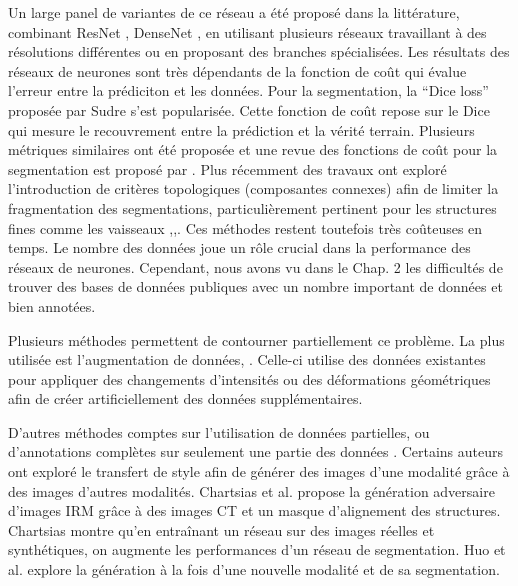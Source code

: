       Un large panel de variantes de ce réseau a été proposé dans la littérature, combinant ResNet \cite{yu2019_liver_ResUnet}, DenseNet \cite{Li2018_DenseUnet}, en utilisant plusieurs réseaux travaillant à des résolutions différentes ou en proposant des branches spécialisées.
      Les résultats des réseaux de neurones sont très dépendants de la fonction de coût qui évalue l'erreur entre la prédiciton et les données. Pour la segmentation, la ``Dice loss'' proposée par Sudre \cite{Sudre2017_DiceLoss} s'est popularisée. Cette fonction de coût repose sur le Dice qui mesure le recouvrement entre la prédiction et la vérité terrain. Plusieurs métriques similaires ont été proposée et une revue des fonctions de coût pour la segmentation est proposé par \cite{Jadon2020_survey_seg_loss}. Plus récemment des travaux ont exploré l'introduction de critères topologiques (composantes connexes) afin de limiter la fragmentation des segmentations, particulièrement pertinent pour les structures fines comme les vaisseaux \cite{Hu2019_topo_homo_persi},\cite{Clough2019_topo_homo_persi},\cite{Ventura2017iterative_topo}. Ces méthodes restent toutefois très coûteuses en temps. 
      Le nombre des données joue un rôle crucial dans la performance des réseaux de neurones. Cependant, nous avons vu dans le Chap. 2 les difficultés de trouver des bases de données publiques avec un nombre important de données et bien annotées. 

      Plusieurs méthodes permettent de contourner partiellement ce problème. La plus utilisée est l'augmentation de données, \cite{Liskowski2016_data_augmentation}. Celle-ci utilise des données existantes pour appliquer des changements d'intensités ou des déformations géométriques afin de créer artificiellement des données supplémentaires.

      D'autres méthodes comptes sur l'utilisation de données partielles, ou d'annotations complètes sur seulement une partie des données \cite{Tajbakhsh2020_imperfect_datasets}. Certains auteurs ont exploré le transfert de style afin de générer des images d'une modalité grâce à des images d'autres modalités. Chartsias et al. \cite{Chartsias2017_heart_adversarial_im} propose la génération adversaire d'images IRM grâce à des images CT et un masque d'alignement des structures. Chartsias montre qu'en entraînant un réseau sur des images réelles et synthétiques, on augmente les performances d'un réseau de segmentation. Huo et al. \cite{Huo2018_adversarial} explore la génération à la fois d'une nouvelle modalité et de sa segmentation.

